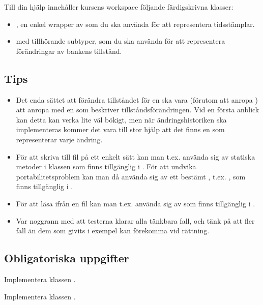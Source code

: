 Till din hjälp innehåller kursens workspace följande färdigskrivna klasser:
\begin{itemize}
\item {}, en enkel wrapper av  som du ska använda för att representera tidsstämplar.
\item {} med tillhörande subtyper, som du ska använda för att representera förändringar av bankens tillstånd.
\end{itemize}


\subsection{Tips}

\begin{itemize}
\item Det enda sättet att förändra tillståndet för en  ska vara (förutom att anropa ) att anropa  med en  som beskriver tillståndsförändringen. Vid en första anblick kan detta kan verka lite väl bökigt, men när ändringshistoriken ska implementeras kommer det vara till stor hjälp att det finns en  som representerar varje ändring.

\item För att skriva till fil på ett enkelt sätt kan man t.ex. använda sig av statiska metoder i klassen  som finns tillgänglig i . För att undvika portabilitetsproblem kan man då använda sig av ett bestämt , t.ex. , som finns tillgänglig i .

\item För att läsa ifrån en fil kan man t.ex. använda sig av  som finns tillgänglig i .

\item Var noggrann med att testerna klarar alla tänkbara fall, och tänk på att fler fall än dem som givits i exempel kan förekomma vid rättning.
\end{itemize}

\subsection{Obligatoriska uppgifter}

\Task Implementera klassen .

\Task Implementera klassen .


